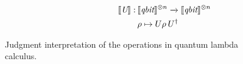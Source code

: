 \begin{figure}[H]
\begin{equation*}
\begin{split}
\begin{aligned}
  \hspace{118pt}
  \begin{minipage}[t]{0.45\textwidth}
  $\begin{aligned}
    [\![\textit{U} ]\!] : \hspace{2pt} & \llbracket \textit{qbit} \rrbracket^{\otimes n} \xrightarrow{} \llbracket 
    \textit{qbit} \rrbracket^{\otimes n} \\
    & \rho \mapsto U \rho \hspace{2pt}  U^{\dag}
  \end{aligned}$
  \end{minipage} \\
  \end{aligned}
  \end{split}
  \end{equation*}
  \caption{Judgment interpretation of the operations in quantum lambda calculus.}
  \label{fig:interpret_ops}
  \end{figure}

